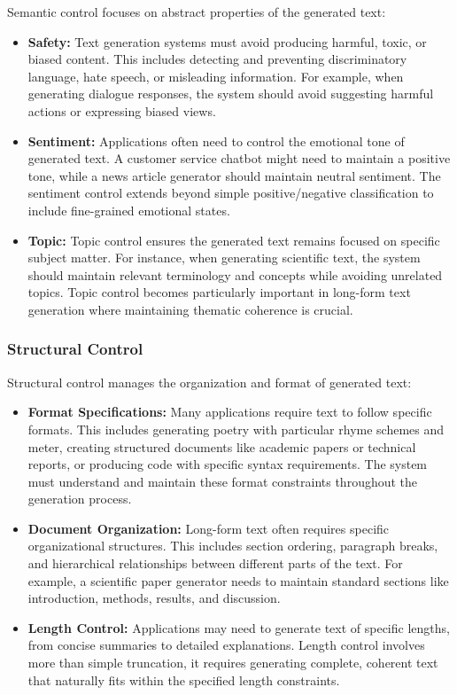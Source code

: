 Semantic control focuses on abstract properties of the generated text:

\begin{itemize}
   \item \textbf{Safety:} Text generation systems must avoid producing harmful, toxic, or biased content. This includes detecting and preventing discriminatory language, hate speech, or misleading information. For example, when generating dialogue responses, the system should avoid suggesting harmful actions or expressing biased views.
   
   \item \textbf{Sentiment:} Applications often need to control the emotional tone of generated text. A customer service chatbot might need to maintain a positive tone, while a news article generator should maintain neutral sentiment. The sentiment control extends beyond simple positive/negative classification to include fine-grained emotional states.
   
   \item \textbf{Topic:} Topic control ensures the generated text remains focused on specific subject matter. For instance, when generating scientific text, the system should maintain relevant terminology and concepts while avoiding unrelated topics. Topic control becomes particularly important in long-form text generation where maintaining thematic coherence is crucial.
\end{itemize}

\subsubsection{Structural Control}

Structural control manages the organization and format of generated text:

\begin{itemize}
   \item \textbf{Format Specifications:} Many applications require text to follow specific formats. This includes generating poetry with particular rhyme schemes and meter, creating structured documents like academic papers or technical reports, or producing code with specific syntax requirements. The system must understand and maintain these format constraints throughout the generation process.
   
   \item \textbf{Document Organization:} Long-form text often requires specific organizational structures. This includes section ordering, paragraph breaks, and hierarchical relationships between different parts of the text. For example, a scientific paper generator needs to maintain standard sections like introduction, methods, results, and discussion.
   
   \item \textbf{Length Control:} Applications may need to generate text of specific lengths, from concise summaries to detailed explanations. Length control involves more than simple truncation, it requires generating complete, coherent text that naturally fits within the specified length constraints.
\end{itemize}

